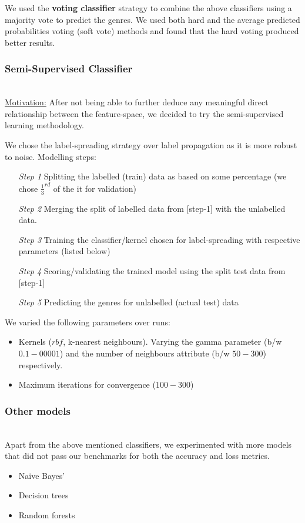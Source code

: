 \documentclass[fleqn,10pt]{SelfArx} %
\begin{document}
We used the \textbf{voting classifier} strategy to combine the above classifiers using a majority vote to predict the genres. We used both hard and the average predicted probabilities voting (soft vote) methods and found that the hard voting produced better results.

\subsubsection{Semi-Supervised Classifier}~\\

\underline{Motivation:} After not being able to further deduce any meaningful direct relationship between the feature-space, we decided to try the semi-supervised learning methodology.

We chose the label-spreading strategy over label propagation as it is more robust to noise{\cite{label-spreading}}. Modelling steps:
\begin{itemize}
  \item[\textit{Step 1}] Splitting the labelled (train) data as based on some percentage (we chose $\frac{1}{3}^{rd}$ of the it for validation)
  \item[\textit{Step 2}] Merging the split of labelled data from [step-1] with the unlabelled data.
  \item[\textit{Step 3}] Training the classifier/kernel chosen for label-spreading with respective parameters (listed below)
  \item[\textit{Step 4}] Scoring/validating the trained model using the split test data from [step-1]
  \item[\textit{Step 5}] Predicting the genres for unlabelled (actual test) data
\end{itemize}

We varied the following parameters over runs:
\begin{itemize}
  \item Kernels ($rbf$, k-nearest neighbours). Varying the gamma parameter (b/w $0.1-00001$) and the number of neighbours attribute (b/w $50-300$) respectively.
  \item Maximum iterations for convergence ($100-300$)
\end{itemize}

\subsubsection*{Other models}~\\
Apart from the above mentioned classifiers, we experimented with more models that did not pass our benchmarks for both the accuracy and loss metrics.
\begin{itemize}
  \item Naive Bayes'
  \item Decision trees
  \item Random forests
\end{itemize}
\end{document}
